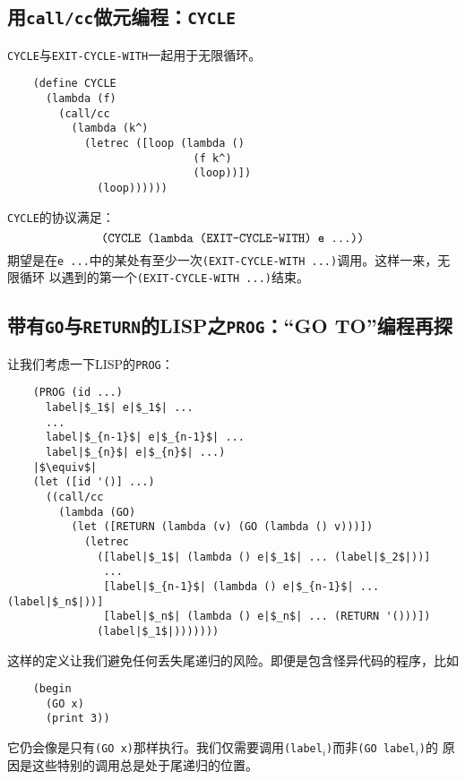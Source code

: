 \documentclass[12pt]{article}
\begin{document}
\subsection{用\texttt{call/cc}做元编程：\texttt{CYCLE}}
\noindent{}\texttt{CYCLE}与\texttt{EXIT-CYCLE-WITH}一起用于无限循环。
\begin{verbatim}
    (define CYCLE
      (lambda (f)
        (call/cc
          (lambda (k^)
            (letrec ([loop (lambda ()
                             (f k^)
                             (loop))])
              (loop))))))
\end{verbatim}
\noindent{}\texttt{CYCLE}的协议满足：
\begin{displaymath}
\textrm{\texttt{(CYCLE (lambda (EXIT-CYCLE-WITH) e ...))}}
\end{displaymath}
\noindent{}期望是在\texttt{e ...}中的某处有至少一次\texttt{(EXIT-CYCLE-WITH ...)}调用。这样一来，无限循环
以遇到的第一个\texttt{(EXIT-CYCLE-WITH ...)}结束。

\subsection{带有\texttt{GO}与\texttt{RETURN}的LISP之\texttt{PROG}：“GO TO”编程再探}
\noindent{}让我们考虑一下LISP的\texttt{PROG}：
\begin{verbatim}
    (PROG (id ...)
      label|$_1$| e|$_1$| ...
      ...
      label|$_{n-1}$| e|$_{n-1}$| ...
      label|$_{n}$| e|$_{n}$| ...)
    |$\equiv$|
    (let ([id '()] ...)
      ((call/cc
        (lambda (GO)
          (let ([RETURN (lambda (v) (GO (lambda () v)))])
            (letrec
              ([label|$_1$| (lambda () e|$_1$| ... (label|$_2$|))]
               ...
               [label|$_{n-1}$| (lambda () e|$_{n-1}$| ... (label|$_n$|))]
               [label|$_n$| (lambda () e|$_n$| ... (RETURN '()))])
              (label|$_1$|)))))))
\end{verbatim}
\noindent{}这样的定义让我们避免任何丢失尾递归的风险。即便是包含怪异代码的程序，比如
\begin{verbatim}
    (begin
      (GO x)
      (print 3))
\end{verbatim}
\noindent{}它仍会像是只有\texttt{(GO x)}那样执行。我们仅需要调用\texttt{(label$_i$)}而非\texttt{(GO label$_i$)}的
原因是这些特别的调用总是处于尾递归的位置。
\end{document}
